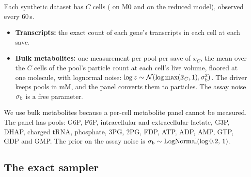 Each synthetic dataset has $C$ cells ( on M0 and  on the reduced model), observed every 60\,s.
\begin{itemize}
  \item \textbf{Transcripts:} the exact count of each gene's transcripts in each cell
  at each save.
  \item \textbf{Bulk metabolites:} one measurement per pool per save of $\bar{x}_C$, the
  mean over the $C$ cells of the pool's particle count at each cell's live volume, floored
  at one molecule, with lognormal noise: $\log z \sim
  \mathcal{N}(\log \max(\bar{x}_C, 1), \sigma_{\mathrm{b}}^2)$. The driver keeps pools in mM, and the
  panel converts them to particles. The assay noise $\sigma_{\mathrm{b}}$ is a free parameter.
\end{itemize}
We use bulk metabolites because a per-cell metabolite panel cannot be measured.
The panel has  pools: G6P, F6P, intracellular and extracellular
lactate, G3P, DHAP, charged tRNA, phosphate, 3PG, 2PG, FDP, ATP, ADP, AMP, GTP, GDP and
GMP. The prior on the assay noise is $\sigma_{\mathrm{b}} \sim \mathrm{LogNormal}(\log 0.2,\, 1)$.

\subsection{The exact sampler}
\label{sec:sampler}


